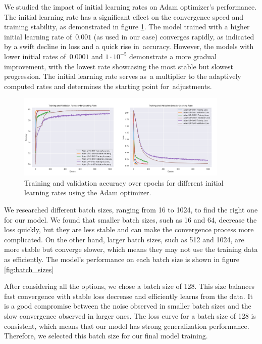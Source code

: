 We studied the impact of initial learning rates on Adam optimizer's performance. The initial learning rate has a significant effect on the convergence speed and training stability, as demonstrated in figure \ref{fig:learning_rates}.
The model trained with a higher initial learning rate of~$0.001$ (as used in our case) converges rapidly, as indicated by a swift decline in loss and a quick rise in~accuracy. However, the models with lower initial rates of~$0.0001$ and $1\cdot10^{-5}$ demonstrate a more gradual improvement, with the lowest rate showcasing the most stable but slowest progression.
The initial learning rate serves as~a multiplier to the adaptively computed rates and determines the starting point for~adjustments.
\begin{figure}[ht!]
	\centering
	\includegraphics[width=0.9\textwidth]{images/adam_learning_rates_comparison.png}
	\caption{Training and validation accuracy over epochs for different initial learning rates using the Adam optimizer.}
	\label{fig:learning_rates}
\end{figure}

We researched different batch sizes, ranging from 16 to 1024, to find the right one for our model. We found that smaller batch sizes, such as 16 and 64, decrease the loss quickly, but they are less stable and can make the convergence process more complicated. On the other hand, larger batch sizes, such as 512 and 1024, are more stable but converge slower, which means they may not use the training data as efficiently. The model's performance on each batch size is shown in figure \ref{fig:batch_sizes}

After considering all the options, we chose a batch size of 128. This size balances fast convergence with stable loss decrease and efficiently learns from the data. It is a good compromise between the noise observed in smaller batch sizes and the slow convergence observed in larger ones. The loss curve for a batch size of 128 is consistent, which means that our model has strong generalization performance. Therefore, we selected this batch size for our final model training.

